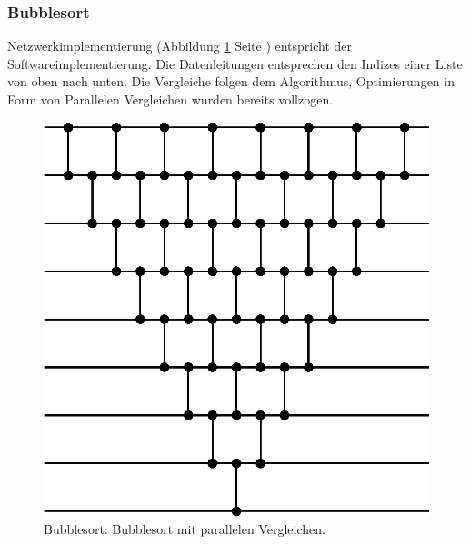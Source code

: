 \documentclass[11pt]{article}
\begin{document}
\subsubsection{Bubblesort}
\FloatBarrier
Netzwerkimplementierung (Abbildung \ref{fig:bubblesort} Seite \pageref{fig:bubblesort}) entspricht der Softwareimplementierung. Die Datenleitungen entsprechen den Indizes einer Liste von oben nach unten. Die Vergleiche folgen dem Algorithmus, Optimierungen in Form von Parallelen Vergleichen wurden bereits vollzogen.
\begin{figure}
\begin{center}
\includegraphics[scale=0.8]{bubblesort.eps}
\end{center}
\caption{Bubblesort: Bubblesort mit parallelen Vergleichen.}
\label{fig:bubblesort}
\end{figure}
\FloatBarrier
\end{document}
